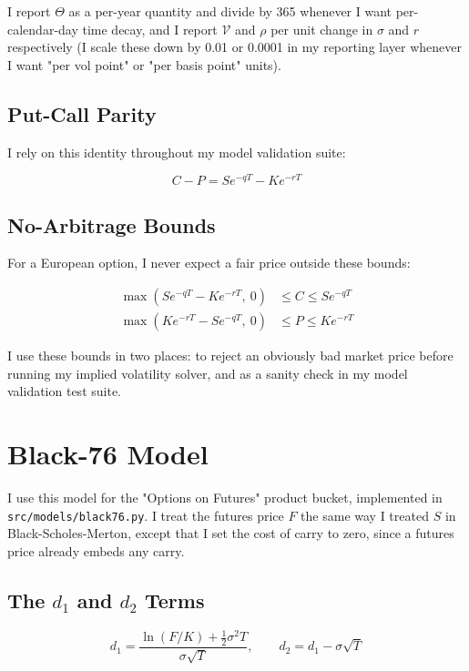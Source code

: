 \documentclass[12pt,a4paper]{article}
\begin{document}
I report $\Theta$ as a per-year quantity and divide by 365 whenever I want
per-calendar-day time decay, and I report $\mathcal{V}$ and $\rho$ per unit
change in $\sigma$ and $r$ respectively (I scale these down by 0.01 or
0.0001 in my reporting layer whenever I want "per vol point" or "per basis
point" units).

\subsection{Put-Call Parity}

I rely on this identity throughout my model validation suite:

\begin{equation}
C - P = S e^{-qT} - K e^{-rT}
\end{equation}

\subsection{No-Arbitrage Bounds}

For a European option, I never expect a fair price outside these bounds:

\begin{align}
\max\left(Se^{-qT} - Ke^{-rT},\ 0\right) &\le C \le Se^{-qT} \\
\max\left(Ke^{-rT} - Se^{-qT},\ 0\right) &\le P \le Ke^{-rT}
\end{align}

I use these bounds in two places: to reject an obviously bad market price
before running my implied volatility solver, and as a sanity check in my
model validation test suite.

\section{Black-76 Model}

I use this model for the "Options on Futures" product bucket, implemented
in \texttt{src/models/black76.py}. I treat the futures price $F$ the same
way I treated $S$ in Black-Scholes-Merton, except that I set the cost of
carry to zero, since a futures price already embeds any carry.

\subsection{The $d_1$ and $d_2$ Terms}

\begin{equation}
d_1 = \frac{\ln(F/K) + \frac{1}{2}\sigma^2 T}{\sigma\sqrt{T}}, \qquad d_2 = d_1 - \sigma\sqrt{T}
\end{equation}
\end{document}

